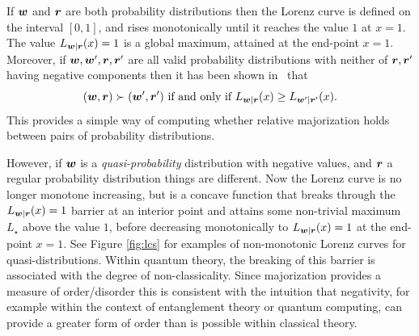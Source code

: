 \documentclass[pra,
aps,
twocolumn,
superscriptaddress,
groupedaddress,
nofootinbib,
reprint
]{revtex4-1}
\begin{document}
If $\boldsymbol{w}$ and $\boldsymbol{r}$ are both probability distributions then the Lorenz curve is defined on the interval $[0,1]$, and rises monotonically until it reaches the value $1$ at $x=1$. The value $L_{\boldsymbol{w}|\boldsymbol{r}}(x) = 1$ is a global maximum, attained at the end-point $x=1$. Moreover, if $\boldsymbol{w}, \boldsymbol{w}', \boldsymbol{r}, \boldsymbol{r}'$ are all valid probability distributions with neither of $\boldsymbol{r},\boldsymbol{r}'$ having negative components then it has been shown in~\cite{ruch_mixing_1978} that
\begin{equation}
(\boldsymbol{w}, \boldsymbol{r}) \succ (\boldsymbol{w}', \boldsymbol{r}') \mbox{ if and only if } L_{\boldsymbol{w} |\boldsymbol{r}}(x) \ge L_{\boldsymbol{w}' |\boldsymbol{r}'}(x).
\end{equation}
This provides a simple way of computing whether relative majorization holds between pairs of probability distributions.

However, if $\boldsymbol{w}$ is a \emph{quasi-probability} distribution with negative values, and $\boldsymbol{r}$ a regular probability distribution things are different. Now the Lorenz curve is no longer monotone increasing, but is a concave function that breaks through the $L_{\boldsymbol{w}|\boldsymbol{r}}(x) = 1$ barrier at an interior point and attains some non-trivial maximum $L_\star$ above the value $1$, before decreasing monotonically to $L_{\boldsymbol{w}|\boldsymbol{r}}(x)= 1$ at the end-point $x=1$. See Figure \ref{fig:lcs} for examples of non-monotonic Lorenz curves for quasi-distributions. Within quantum theory, the breaking of this barrier is associated with the degree of non-classicality. Since majorization provides a measure of order/disorder this is consistent with the intuition that negativity, for example within the context of entanglement theory or quantum computing, can provide a greater form of order than is possible within classical theory.
\end{document}
